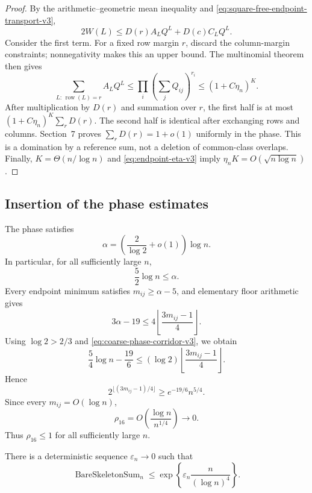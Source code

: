 \begin{proof}
By the arithmetic--geometric mean inequality and
\eqref{eq:square-free-endpoint-transport-v3},
\[
  2W(L)
  \le
  D(r)A_LQ^L+D(c)C_LQ^L.
\]
Consider the first term. For a fixed row margin $r$, discard the column-margin
constraints; nonnegativity makes this an upper bound. The multinomial theorem
then gives
\[
  \sum_{L:\,\operatorname{row}(L)=r}A_LQ^L
  \le
  \prod_i\left(\sum_jQ_{ij}\right)^{r_i}
  \le
  (1+C\eta_n)^K.
\]
After multiplication by $D(r)$ and summation over $r$, the first half is at
most $(1+C\eta_n)^K\sum_rD(r)$. The second half is identical after exchanging
rows and columns. Section~7 proves $\sum_rD(r)=1+o(1)$ uniformly in the phase.
This is a domination by a reference sum, not a deletion of common-class
overlaps. Finally, $K=\Theta(n/\log n)$ and
\eqref{eq:endpoint-eta-v3} imply
$\eta_nK=O(\sqrt{n\log n})$.
\end{proof}

\subsection{Insertion of the phase estimates}

The phase satisfies
\[
  \alpha
  =
  \left(\frac{2}{\log 2}+o(1)\right)\log n.
\]
In particular, for all sufficiently large $n$,
\begin{equation}
  \frac52\log n\le\alpha.
  \label{eq:coarse-phase-corridor-v3}
\end{equation}
Every endpoint minimum satisfies $m_{ij}\ge\alpha-5$, and elementary floor
arithmetic gives
\[
  3\alpha-19
  \le
  4\left\lfloor\frac{3m_{ij}-1}{4}\right\rfloor.
\]
Using $\log 2>2/3$ and \eqref{eq:coarse-phase-corridor-v3}, we obtain
\begin{equation}
  \frac54\log n-\frac{19}{6}
  \le
  (\log 2)
  \left\lfloor\frac{3m_{ij}-1}{4}\right\rfloor.
  \label{eq:coarse-log-budget-v3}
\end{equation}
Hence
\[
  2^{\lfloor(3m_{ij}-1)/4\rfloor}
  \ge
  e^{-19/6}n^{5/4}.
\]
Since every $m_{ij}=O(\log n)$,
\begin{equation}
  \rho_{16}
  =O\!\left(\frac{\log n}{n^{1/4}}\right)
  \longrightarrow0.
  \label{eq:rho-sixteen-small-v3}
\end{equation}
Thus $\rho_{16}\le1$ for all sufficiently large $n$.

\begin{proposition}
\label{prop:bare-high-skeleton-v3}
There is a deterministic sequence $\varepsilon_n\to0$ such that
\begin{equation}
  \operatorname{BareSkeletonSum}_n
  \le
  \exp\!\left\{
    \varepsilon_n\frac{n}{(\log n)^4}
  \right\}.
  \label{eq:bare-skeleton-final-v3}
\end{equation}
\end{proposition}

